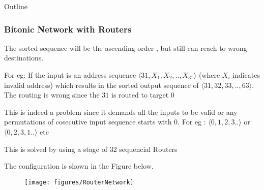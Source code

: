 \begin{frame}[allowframebreaks]{Outline}
\frametitle{Bitonic Network with Routers}
  \item The sorted sequence will be the ascending order , but still can reach to wrong destinations. \\
  \item For eg: If the input is an address sequence $\langle31,X_{1},X_{2},..,X_{31}\rangle$ (where $X_{i}$ indicates invalid address) which results in the sorted output sequence 
					      of $\langle31,32,33,..,63\rangle$. The routing is wrong since the $31$ is routed to target $0$ \\
  \item This is indeed a problem since it demands all the inputs to be valid or any permutations of cosecutive input sequence starts with $0$. For eg :  $\langle 0,1,2,3..\rangle$ or $\langle 0,2,3,1..\rangle$ etc\\
  \item This is solved by using a stage of 32 sequencial Routers \\
  \item The configuration is shown in the Figure below.\\
   \begin{figure}[!ht]
    \texttt{[image: figures/RouterNetwork]}

\end{figure}
\end{frame}
